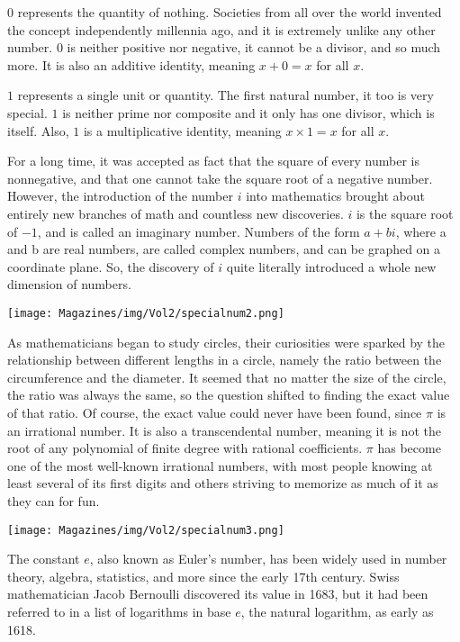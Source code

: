 \documentclass{article}
\begin{document}
\begin{multicols}{3}
$0$ represents the quantity of nothing. Societies from all over the world invented the concept independently millennia ago, and it is extremely unlike any other number. 0 is neither positive nor negative, it cannot be a divisor, and so much more. It is also an additive identity, meaning   $x + 0 = x$ for all $x$. 


$1$ represents a single unit or quantity. The first natural number, it too is very special. $1$ is neither prime nor composite and it only has one divisor, which is itself. Also, $1$ is a multiplicative identity, meaning $x\times 1 = x$ for all $x$. 

For a long time, it was accepted as fact that the square of every number is nonnegative, and that one cannot take the square root of a negative number. However, the introduction of the number $i$ into mathematics brought about entirely new branches of math and countless new discoveries. $i$ is the square root of $-1$, and is called an imaginary number. Numbers of the form $a + bi$, where a and b are real numbers, are called complex numbers, and can be graphed on a coordinate plane. So, the discovery of $i$ quite literally introduced a whole new dimension of numbers.
\begin{center}
    \texttt{[image: Magazines/img/Vol2/specialnum2.png]}
\end{center}
As mathematicians began to study circles, their curiosities were sparked by the relationship between different lengths in a circle, namely the ratio between the circumference and the diameter. It seemed that no matter the size of the circle, the ratio was always the same, so the question shifted to finding the exact value of that ratio. Of course, the exact value could never have been found, since $\pi$ is an irrational number. It is also a transcendental number, meaning it is not the root of any polynomial of finite degree with rational coefficients. $\pi$ has become one of the most well-known irrational numbers, with most people knowing at least several of its first digits and others striving to memorize as much of it as they can for fun.
\begin{center}
    \texttt{[image: Magazines/img/Vol2/specialnum3.png]}
\end{center}
The constant $e$, also known as Euler’s number, has been widely used in number theory, algebra, statistics, and more since the early 17th century. Swiss mathematician Jacob Bernoulli discovered its value in 1683, but it had been referred to in a list of logarithms in base $e$, the natural logarithm, as early as 1618.


\end{multicols}
\end{document}

